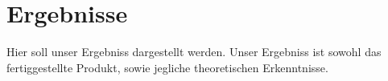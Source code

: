 \chapter{Ergebnisse} \label{ergebnisse}

\nocite{*}


Hier soll unser Ergebniss dargestellt werden. Unser Ergebniss ist sowohl das fertiggestellte Produkt, sowie jegliche theoretischen Erkenntnisse.